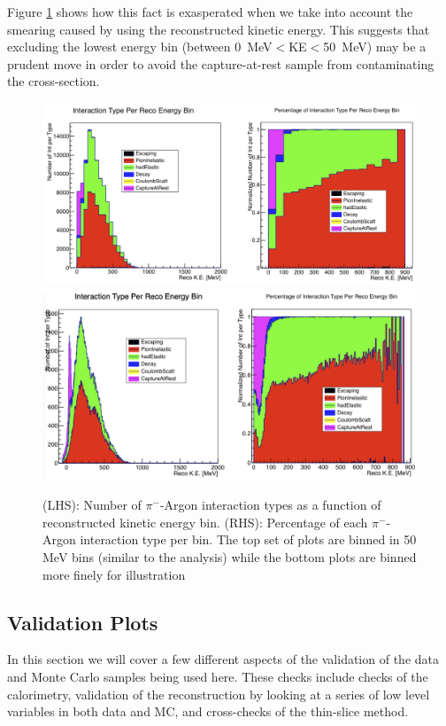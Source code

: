 Figure \ref{fig:TrueInteractionTypesRecoE} shows how this fact is exasperated when we take into account the smearing caused by using the reconstructed kinetic energy. This suggests that excluding the lowest energy bin (between 0~MeV$<$KE$<$50~MeV) may be a prudent move in order to avoid the capture-at-rest sample from contaminating the cross-section.

\begin{figure}[h!]
\centering
\includegraphics[scale=0.33]{./images/PiArIntTypesReco.png}
\includegraphics[scale=0.33]{./images/PiArIntTypesRecoFineBin.png}
\caption{(LHS): Number of $\pi^{-}$-Argon interaction types as a function of reconstructed kinetic energy bin. (RHS): Percentage of each $\pi^{-}$-Argon interaction type per bin. The top set of plots are binned in 50 MeV bins (similar to the analysis) while the bottom plots are binned more finely for illustration}
\label{fig:TrueInteractionTypesRecoE}
\end{figure}


\subsection{Validation Plots} \label{sec:ValidationPlots}
In this section we will cover a few different aspects of the validation of the data and Monte Carlo samples being used here. These checks include checks of the calorimetry, validation of the reconstruction by looking at a series of low level variables in both data and MC, and cross-checks of the thin-slice method.

